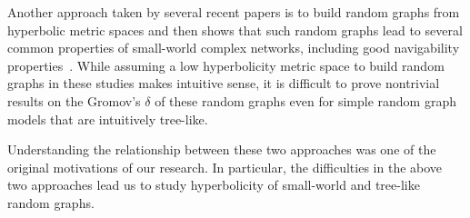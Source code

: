 \documentclass[11pt]{article}
\begin{document}
Another approach taken by several recent papers 
is to build random graphs from hyperbolic metric spaces and then shows that such random graphs lead to several 
common properties of small-world complex networks, including good 
navigability properties~\cite{BKC09,PKBV10,KPKVB10,KPVB09}.
While assuming a low hyperbolicity metric space to
	build random graphs in these studies makes intuitive sense, it is 
difficult to prove nontrivial results on the Gromov's $\delta$ 
	of these random graphs even for simple 
	random graph models that are intuitively tree-like.


Understanding the relationship between these two 
approaches was one of the original motivations of 
our research.
In particular, the difficulties in the above two approaches lead us to study hyperbolicity
	of small-world and tree-like random graphs.
\end{document}

